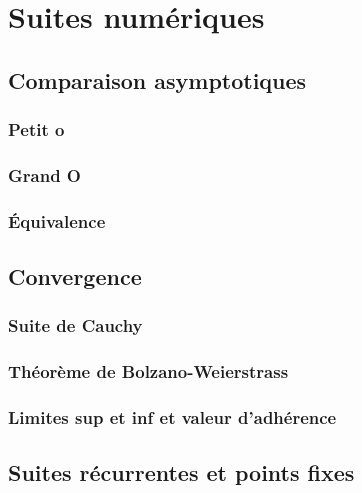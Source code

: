 
\chapter{Suites numériques}
\label{chap:2}

\section{Comparaison asymptotiques}

\subsection{Petit o}

\subsection{Grand O}

\subsection{Équivalence}

\section{Convergence}

\subsection{Suite de Cauchy}

% 

\subsection{Théorème de Bolzano-Weierstrass}

\subsection{Limites sup et inf et valeur d'adhérence}

\section{Suites récurrentes et points fixes}


